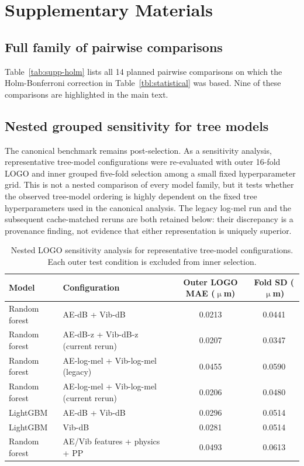 \section*{Supplementary Materials}

\subsection*{Full family of pairwise comparisons}

Table~\ref{tab:supp-holm} lists all 14 planned pairwise comparisons on
which the Holm-Bonferroni correction in Table~\ref{tbl:statistical} was
based. Nine of these comparisons are highlighted in the main text.

\begin{table}[htbp]
\centering
\caption{Full family of pairwise Wilcoxon signed-rank tests with
Holm-Bonferroni correction.}\label{tab:supp-holm}
\resizebox{\linewidth}{!}{}
\end{table}

\subsection*{Nested grouped sensitivity for tree models}

The canonical benchmark remains post-selection. As a sensitivity analysis,
representative tree-model configurations were re-evaluated with outer 16-fold
LOGO and inner grouped five-fold selection among a small fixed hyperparameter
grid. This is not a nested comparison of every model family, but it tests
whether the observed tree-model ordering is highly dependent on the fixed tree
hyperparameters used in the canonical analysis. The legacy log-mel run and
the subsequent cache-matched reruns are both retained below: their discrepancy
is a provenance finding, not evidence that either representation is uniquely
superior.

\begin{table}[htbp]
\centering
\caption{Nested LOGO sensitivity analysis for representative tree-model
configurations. Each outer test condition is excluded from inner selection.}
\label{tab:supp-nested-logo}
\begin{tabular}{@{}llcc@{}}
\toprule
Model & Configuration & Outer LOGO MAE (\(\upmu\)m) & Fold SD (\(\upmu\)m) \\
\midrule
Random forest & AE-dB + Vib-dB & 0.0213 & 0.0441 \\
Random forest & AE-dB-z + Vib-dB-z (current rerun) & 0.0207 & 0.0347 \\
Random forest & AE-log-mel + Vib-log-mel (legacy) & 0.0455 & 0.0590 \\
Random forest & AE-log-mel + Vib-log-mel (current rerun) & 0.0206 & 0.0480 \\
LightGBM & AE-dB + Vib-dB & 0.0296 & 0.0514 \\
LightGBM & Vib-dB & 0.0281 & 0.0514 \\
Random forest & AE/Vib features + physics + PP & 0.0493 & 0.0613 \\
\bottomrule
\end{tabular}
\end{table}

